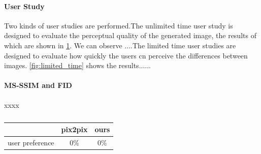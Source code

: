 \paragraph{User Study} Two kinds of user studies are performed.The unlimited time user study is designed to evaluate the perceptual quality of the generated image, the results of which are shown in  \ref{table:unlimited_time}. We can observe  ....The limited time user studies are designed to evaluate how quickly the users cn perceive the differences between images.  \ref{fig:limited_time} shows the results......
\paragraph{MS-SSIM and FID} xxxx
%
%
\begin{table}[h]
	\centering
	\label{table:unlimited_time}
	\caption{}
	\begin{tabular}{|l|c|c|}\hline
		 & pix2pix & ours \\\hline
		user preference&$0\%$&$0\%$\\\hline
	\end{tabular}
\end{table}


